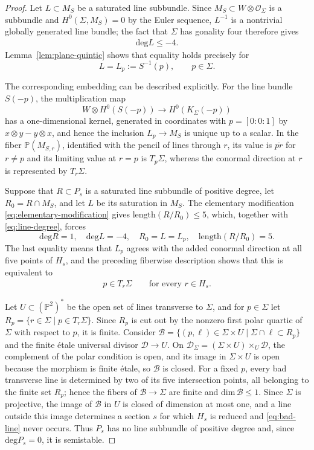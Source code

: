 \documentclass[oneside,11pt]{amsart}
\theoremstyle{definition}
\theoremstyle{remark}
\numberwithin{thm}{section}
\numberwithin{equation}{section}
\begin{document}
\begin{proof}
Let $L\subset M_S$ be a saturated line subbundle.  Since
$M_S\subset W\otimes\mathcal{O}_\Sigma$ is a subbundle and
$H^0(\Sigma,M_S)=0$ by the Euler sequence, $L^{-1}$ is a nontrivial globally
generated line bundle; the fact that $\Sigma$ has gonality four therefore
gives
\begin{align}\label{eq:line-degree}
 \mathrm{deg} L\leq-4.
\end{align}
Lemma~\ref{lem:plane-quintic} shows that equality holds precisely for
\[
 L=L_p:=S^{-1}(p),\qquad p\in \Sigma.
\]

The corresponding embedding can be described explicitly.  For the line
bundle $S(-p)$, the multiplication map
\[
 W\otimes H^0(S(-p))\longrightarrow H^0(K_\Sigma(-p))
\]
has a one-dimensional kernel, generated in coordinates with
$p=[0:0:1]$ by $x\otimes y-y\otimes x$, and hence the inclusion
$L_p\to M_S$ is unique up to a scalar.  In the fiber
$\mathbb{P}(M_{S,r})$, identified with the pencil of lines through $r$, its
value is $\overline{pr}$ for $r\neq p$ and its limiting value at $r=p$ is
$T_p\Sigma$, whereas the conormal direction at $r$ is represented by
$T_r\Sigma$.

Suppose that $R\subset P_s$ is a saturated line subbundle of positive
degree, let $R_0=R\cap M_S$, and let $L$ be its saturation in $M_S$.  The
elementary modification \eqref{eq:elementary-modification} gives
$\mathrm{length}(R/R_0)\leq5$, which, together with
\eqref{eq:line-degree}, forces
\[
 \mathrm{deg} R=1,\quad \mathrm{deg} L=-4,\quad R_0=L=L_p,\quad
 \mathrm{length}(R/R_0)=5.
\]
The last equality means that $L_p$ agrees with the added conormal direction
at all five points of $H_s$, and the preceding fiberwise description shows
that this is equivalent to
\begin{align}\label{eq:bad-line}
 p\in T_r\Sigma\qquad\text{for every }r\in H_s.
\end{align}

Let $U\subset(\mathbb{P}^2)^*$ be the open set of lines transverse to
$\Sigma$, and for $p\in\Sigma$ let
$R_p=\{r\in\Sigma \mid p\in T_r\Sigma\}$.  Since $R_p$ is cut out by the nonzero
first polar quartic of $\Sigma$ with respect to $p$, it is finite.  Consider
$\mathcal{B}=\{(p,\ell)\in\Sigma\times U \mid \Sigma\cap\ell\subset R_p\}$ and
the finite \'etale universal divisor $\mathcal{D}\to U$.  On
$\mathcal{D}_\Sigma=(\Sigma\times U)\times_U\mathcal{D}$, the complement of
the polar condition is open, and its image in $\Sigma\times U$ is open
because the morphism is finite \'etale, so $\mathcal{B}$ is closed.  For a
fixed $p$, every bad transverse line is determined by two of its five
intersection points, all belonging to the finite set $R_p$; hence the
fibers of $\mathcal{B}\to\Sigma$ are finite and
$\mathrm{dim}\,\mathcal{B}\leq1$.  Since $\Sigma$ is projective, the image
of $\mathcal{B}$ in $U$ is closed of dimension at most one, and a line
outside this image determines a section $s$ for which $H_s$ is reduced and
\eqref{eq:bad-line} never occurs.  Thus $P_s$ has no line
subbundle of positive degree and, since $\mathrm{deg}P_s=0$, it is semistable.
\end{proof}
\end{document}
